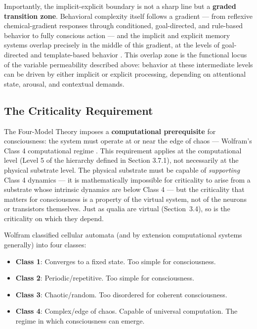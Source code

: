\documentclass[12pt]{article}
\begin{document}
Importantly, the implicit-explicit boundary is not a sharp line but a \textbf{graded transition zone}. Behavioral complexity itself follows a gradient --- from reflexive chemical-gradient responses through conditioned, goal-directed, and rule-based behavior to fully conscious action --- and the implicit and explicit memory systems overlap precisely in the middle of this gradient, at the levels of goal-directed and template-based behavior \citep{Gruber2015}. This overlap zone is the functional locus of the variable permeability described above: behavior at these intermediate levels can be driven by either implicit or explicit processing, depending on attentional state, arousal, and contextual demands.


\subsection{The Criticality Requirement}


The Four-Model Theory imposes a \textbf{computational prerequisite} for consciousness: the system must operate at or near the edge of chaos --- Wolfram's Class 4 computational regime \citep{Wolfram2002}. This requirement applies at the computational level (Level 5 of the hierarchy defined in Section 3.7.1), not necessarily at the physical substrate level. The physical substrate must be capable of \emph{supporting} Class 4 dynamics --- it is mathematically impossible for criticality to arise from a substrate whose intrinsic dynamics are below Class 4 --- but the criticality that matters for consciousness is a property of the virtual system, not of the neurons or transistors themselves. Just as qualia are virtual (Section~3.4), so is the criticality on which they depend.

Wolfram classified cellular automata (and by extension computational systems generally) into four classes:
\begin{itemize}
\item \textbf{Class 1}: Converges to a fixed state. Too simple for consciousness.
\item \textbf{Class 2}: Periodic/repetitive. Too simple for consciousness.
\item \textbf{Class 3}: Chaotic/random. Too disordered for coherent consciousness.
\item \textbf{Class 4}: Complex/edge of chaos. Capable of universal computation. The regime in which consciousness can emerge.
\end{itemize}
\end{document}
